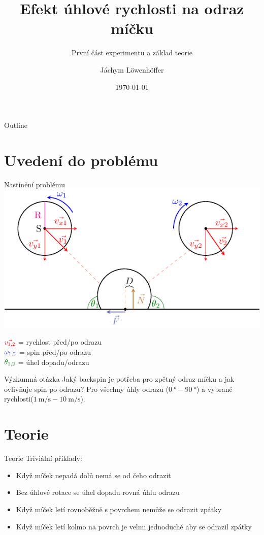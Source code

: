 \documentclass{beamer}
\title{Efekt úhlové rychlosti na odraz míčku}
\subtitle{První část experimentu a základ teorie}
\author{Jáchym Löwenhöffer}
\institute{GEVO JM}
\date{\today}
\begin{document}
  \begin{frame}
  \titlepage
 \end{frame}

 \begin{frame}{Outline}
  \tableofcontents
 \end{frame}

 \section{Uvedení do problému}
 
 \begin{frame}{Nastínění problému}
  \centering
  \includegraphics{diagram.pdf}\\
  \raggedright
  $\color{red}\vec{v_{1,2}}$ = rychlost před/po odrazu \\
  $\color{blue}\omega_{1,2}$ = spin před/po odrazu \\
  $\color[rgb]{0,0.5,0}\theta_{1,2}$ = úhel dopadu/odrazu \\
  
 \end{frame}

 \begin{frame}{Výzkumná otázka}
  \centering
  Jaký backspin je potřeba pro zpětný odraz míčku a jak ovlivňuje spin po
  odrazu? Pro všechny úhly odrazu
  ($\qty{0}{\degree}-\qty{90}{\degree}$) a vybrané
  rychlosti($\qty{1}{\meter\per\second} - \qty{10}{\meter\per\second}$).
 \end{frame}

 \section{Teorie} 

 \begin{frame}{Teorie}
  Triviální příklady:
  \begin{itemize}
   \item Když míček nepadá dolů nemá se od čeho odrazit 
   \item Bez úhlové rotace se úhel dopadu rovná úhlu odrazu
   \item Když míček letí rovnoběžně s povrchem nemůže se odrazit zpátky
   \item Když míček letí kolmo na povrch je velmi jednoduché aby se odrazil
    zpátky
  \end{itemize}
 \end{frame}
\end{document}
